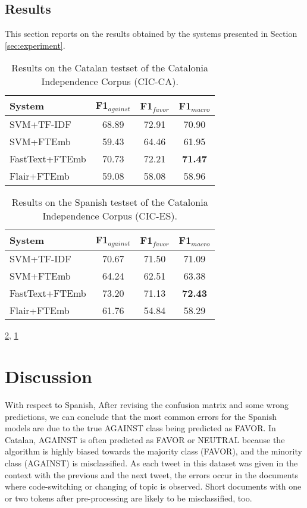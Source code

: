 \documentclass[10pt, a4paper]{article}
\begin{document}
\subsection{Results}\label{sec:results}

This section reports on the results obtained by the systems presented in Section \ref{sec:experiment}.

\begin{table}[!ht]
\begin{tabular}{lccc}\hline
\textbf{System} & F1$_{against}$ & F1$_{favor}$ & F1$_{macro}$ \\ \hline
SVM+TF-IDF & 68.89 & 72.91 & 70.90 \\
SVM+FTEmb & 59.43 & 64.46 & 61.95 \\
FastText+FTEmb & 70.73 & 72.21 & \textbf{71.47} \\
Flair+FTEmb & 59.08 & 58.08 & 58.96 \\ \hline
\end{tabular}
\caption{Results on the Catalan testset of the Catalonia Independence Corpus (CIC-CA).}\label{tab:result_indep_ca}
\end{table}

\begin{table}[!ht]
\centering
\begin{tabular}{lccc}\hline
\textbf{System} & F1$_{against}$ & F1$_{favor}$ & F1$_{macro}$ \\ \hline
SVM+TF-IDF & 70.67 & 71.50 & 71.09 \\
SVM+FTEmb & 64.24 & 62.51 & 63.38 \\
FastText+FTEmb & 73.20 & 71.13 & \textbf{72.43} \\
Flair+FTEmb & 61.76 & 54.84 & 58.29 \\ \hline
\end{tabular}
\caption{Results on the Spanish testset of the Catalonia Independence Corpus (CIC-ES).}\label{tab:result_indep_es}
\end{table}

\ref{tab:result_indep_es}, \ref{tab:result_indep_ca}

\section{Discussion}\label{sec:discussion}

With respect to Spanish, After revising the confusion matrix and some wrong predictions, we can conclude that the most common errors for the Spanish models are due to the true AGAINST class being predicted as FAVOR. In Catalan, AGAINST is often predicted as FAVOR or NEUTRAL because the algorithm is highly biased towards the majority class (FAVOR), and the minority class (AGAINST) is misclassified. As each tweet in this dataset was given in the context with the previous and the next tweet, the errors occur in the documents where code-switching or changing of topic is observed. Short documents with one or two tokens after pre-processing are likely to be misclassified, too.
\end{document}
